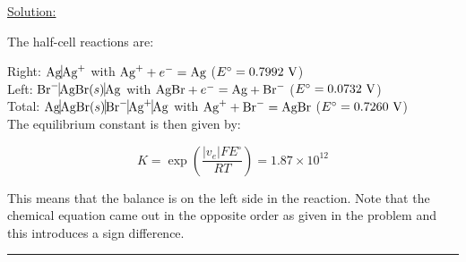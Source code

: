 \noindent
\underline{Solution:}

The half-cell reactions are:

Right: $\textnormal{Ag} \vline \textnormal{Ag}^+$ with $\textnormal{Ag}^+ + e^- = \textnormal{Ag}$ ($E^\circ = 0.7992\textnormal{ V}$)\\
Left: $\textnormal{Br}^- \vline \textnormal{AgBr}(s) \vline \textnormal{Ag}$ with $\textnormal{AgBr} + e^- = \textnormal{Ag} + \textnormal{Br}^-$ ($E^\circ = 0.0732\textnormal{ V}$)\\
Total: $\textnormal{Ag} \vline \textnormal{AgBr}(s) \vline \textnormal{Br}^- \vline \textnormal{Ag}^+ \vline \textnormal{Ag}$ with $\textnormal{Ag}^+ + \textnormal{Br}^- = \textnormal{AgBr}$ ($E^\circ = 0.7260\textnormal{ V}$)\\

The equilibrium constant is then given by:

$$K = \exp\left(\frac{\left|v_e\right|FE^\circ}{RT}\right) = 1.87\times 10^{12}$$

This means that the balance is on the left side in the reaction. Note that the chemical equation came out in the opposite order as given in the problem and this introduces a sign difference.

\hrule\vspace{0.5cm}
